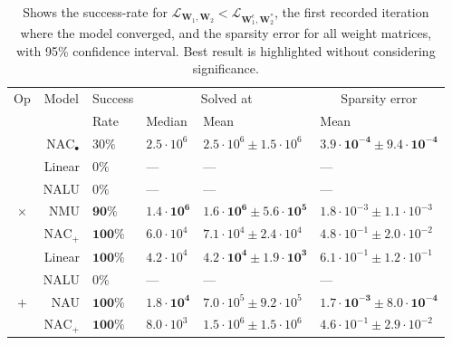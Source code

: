 \begin{table}[!h]

\caption{\label{tab:function-task-static-defaults}Shows the success-rate for $\mathcal{L}_{\mathbf{W}_1, \mathbf{W}_2} < \mathcal{L}_{\mathbf{W}_1^\epsilon, \mathbf{W}_2^*}$, the first recorded iteration where the model converged, and the sparsity error for all weight matrices, with 95\% confidence interval. Best result is highlighted without considering significance.}
\centering
\begin{tabular}{crllll}
\toprule
\multicolumn{1}{c}{Op} & \multicolumn{1}{c}{Model} & \multicolumn{1}{c}{Success} & \multicolumn{2}{c}{Solved at} & \multicolumn{1}{c}{Sparsity error} \\
\cmidrule(l{3pt}r{3pt}){1-1} \cmidrule(l{3pt}r{3pt}){2-2} \cmidrule(l{3pt}r{3pt}){3-3} \cmidrule(l{3pt}r{3pt}){4-5} \cmidrule(l{3pt}r{3pt}){6-6}
 &  & Rate & Median & Mean & Mean\\
\midrule
 & $\mathrm{NAC}_{\bullet}$ & $30\%$ & $2.5 \cdot 10^{6}$ & $2.5 \cdot 10^{6} \pm 1.5 \cdot 10^{6}$ & $\mathbf{3.9 \cdot 10^{-4} \pm 9.4 \cdot 10^{-4}}$\\

 & Linear & $0\%$ & --- & --- & ---\\

 & NALU & $0\%$ & --- & --- & ---\\

\multirow{-4}{*}{\centering\arraybackslash $\bm{\times}$} & NMU & $\mathbf{90\%}$ & $\mathbf{1.4 \cdot 10^{6}}$ & $\mathbf{1.6 \cdot 10^{6} \pm 5.6 \cdot 10^{5}}$ & $1.8 \cdot 10^{-3} \pm 1.1 \cdot 10^{-3}$\\
\cmidrule{1-6}
 & $\mathrm{NAC}_{+}$ & $\mathbf{100\%}$ & $6.0 \cdot 10^{4}$ & $7.1 \cdot 10^{4} \pm 2.4 \cdot 10^{4}$ & $4.8 \cdot 10^{-1} \pm 2.0 \cdot 10^{-2}$\\

 & Linear & $\mathbf{100\%}$ & $4.2 \cdot 10^{4}$ & $\mathbf{4.2 \cdot 10^{4} \pm 1.9 \cdot 10^{3}}$ & $6.1 \cdot 10^{-1} \pm 1.2 \cdot 10^{-1}$\\

 & NALU & $0\%$ & --- & --- & ---\\

\multirow{-4}{*}{\centering\arraybackslash $\bm{+}$} & NAU & $\mathbf{100\%}$ & $\mathbf{1.8 \cdot 10^{4}}$ & $7.0 \cdot 10^{5} \pm 9.2 \cdot 10^{5}$ & $\mathbf{1.7 \cdot 10^{-3} \pm 8.0 \cdot 10^{-4}}$\\
\cmidrule{1-6}
 & $\mathrm{NAC}_{+}$ & $\mathbf{100\%}$ & $8.0 \cdot 10^{3}$ & $1.5 \cdot 10^{6} \pm 1.5 \cdot 10^{6}$ & $4.6 \cdot 10^{-1} \pm 2.9 \cdot 10^{-2}$\\


\end{tabular}
\end{table}
